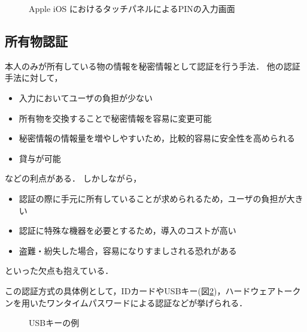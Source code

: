 \begin{figure}[th]
\begin{center}
\end{center}
\caption{Apple iOS におけるタッチパネルによるPINの入力画面}
\label{fig:iosPIN}
\end{figure}

\subsection{所有物認証}\label{subsec:possession}
本人のみが所有している物の情報を秘密情報として認証を行う手法．
他の認証手法に対して，
\begin{itemize}
\item 入力においてユーザの負担が少ない
\item 所有物を交換することで秘密情報を容易に変更可能
\item 秘密情報の情報量を増やしやすいため，比較的容易に安全性を高められる
\item 貸与が可能
\end{itemize}
などの利点がある．
しかしながら，
\begin{itemize}
\item 認証の際に手元に所有していることが求められるため，ユーザの負担が大きい
\item 認証に特殊な機器を必要とするため，導入のコストが高い
\item 盗難・紛失した場合，容易になりすましされる恐れがある
\end{itemize}
といった欠点も抱えている．

この認証方式の具体例として，IDカードやUSBキー(図\ref{fig:dongle})，ハードウェアトークンを用いたワンタイムパスワードによる認証などが挙げられる．

\begin{figure}[th]
\begin{center}
\end{center}
\caption{USBキーの例}
\label{fig:dongle}
\end{figure}


